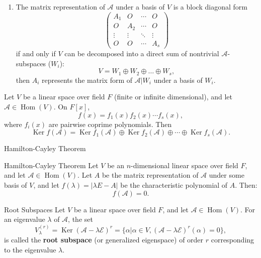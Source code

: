 \documentclass[11pt]{../../TexTemplate/elegantbook} %
\begin{document}
\begin{theorem}
\begin{enumerate}
        \item The matrix representation of \( \mathcal{A} \) under a basis of \( V \) 
            is a block diagonal form 
            \[
            \begin{pmatrix}
                A_1 & O & \cdots & O \\
                O & A_2 & \cdots & O \\
                \vdots & \vdots & \ddots & \vdots \\
                O & O & \cdots & A_s
            \end{pmatrix}
            \]
            if and only if \( V \) can be decomposed into a direct sum of nontrivial \( \mathcal{A} \)-subspaces (\(W_{i}\)):
            \[
            V = W_1 \oplus W_2 \oplus \dots \oplus W_s,
            \]
            then \( A_i \) represents the matrix form of \( \mathcal{A}|{W_i} \) under a basis of \( W_i \).
    \end{enumerate}
\end{theorem}

\begin{proposition}
    Let \( V \) be a linear space over field \( F \) (finite or infinite dimensional), 
    and let \( \mathcal{A}\in \operatorname{Hom}(V) \).
    On \(F[x]\), 
    \[
    f(x) = f_{1}(x)f_{2}(x)\cdots f_{s}(x),
    \]
    where \( f_{i}(x) \) are pairwise coprime polynomials.
    Then
    \[
    \operatorname{Ker}f(\mathcal{A}) 
    = \operatorname{Ker}f_{1}(\mathcal{A}) \oplus 
    \operatorname{Ker}f_{2}(\mathcal{A}) \oplus \cdots \oplus \operatorname{Ker}f_{s}(\mathcal{A}).
    \]
\end{proposition}



\begin{leftbarTitle}{Hamilton-Cayley Theorem}\end{leftbarTitle}
\begin{theorem}{Hamilton-Cayley Theorem}
    Let \( V \) be an \( n \)-dimensional linear space over field \( F \), 
    and let \( \mathcal{A}\in \operatorname{Hom}(V) \).
    Let \( A \) be the matrix representation of \( \mathcal{A} \) under some basis of \( V \),
    and let \( f(\lambda) = |\lambda E - A| \) be the characteristic polynomial of \( A \).
    Then:
    \[
    f(\mathcal{A}) = 0.
    \]
\end{theorem}

\begin{definition}{Root Subspaces}
    Let \( V \) be a linear space over field \( F \), 
    and let \( \mathcal{A}\in \operatorname{Hom}(V) \).
    For an eigenvalue \( \lambda \) of \( \mathcal{A} \),
    the set
    \[
    V_{\lambda}^{(r)} = \operatorname{Ker}(\mathcal{A} - \lambda \mathcal{E})^{r} = 
    \{ \alpha | \alpha \in V, (\mathcal{A} - \lambda \mathcal{E})^{r}(\alpha) = 0 \},
    \]
    is called the \textbf{root subspace} (or generalized eigenspace) of order \( r \)
    corresponding to the eigenvalue \( \lambda \).
\end{definition}
\end{document}
